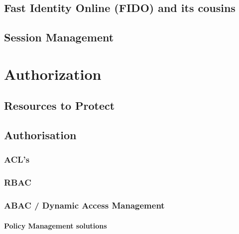 \hypertarget{fast-identity-online-fido-and-its-cousins}{%
\subsection{Fast Identity Online (FIDO) and its
cousins}\label{fast-identity-online-fido-and-its-cousins}}

\hypertarget{session-management}{%
\subsection{Session Management}\label{session-management}}

\hypertarget{authorization}{%
\section{Authorization}\label{authorization}}

\hypertarget{resources-to-protect}{%
\subsection{Resources to Protect}\label{resources-to-protect}}

\hypertarget{authorisation}{%
\subsection{Authorisation}\label{authorisation}}

\hypertarget{acls}{%
\subsubsection{ACL's}\label{acls}}

\hypertarget{rbac}{%
\subsubsection{RBAC}\label{rbac}}

\hypertarget{abac-dynamic-access-management}{%
\subsubsection{ABAC / Dynamic Access
Management}\label{abac-dynamic-access-management}}

\hypertarget{policy-management-solutions}{%
\paragraph{Policy Management
solutions}\label{policy-management-solutions}}


